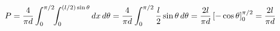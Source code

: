 \documentclass[preview]{standalone}
\begin{document}
\begin{align*}
\special{dvisvgm:raw <g id='unique000'>}P=\dfrac{4}{\pi d}\displaystyle\int_0^{\pi/2}\!\!\int_0^{(l/2)\sin\theta}dx\,d\theta=\dfrac{4}{\pi d}\int_0^{\pi/2}\dfrac{l}{2}\sin\theta\,d\theta=\dfrac{2l}{\pi d}\left[-\cos\theta\right]_0^{\pi/2}=\dfrac{2l}{\pi d}\special{dvisvgm:raw </g>}
\end{align*}
\end{document}

